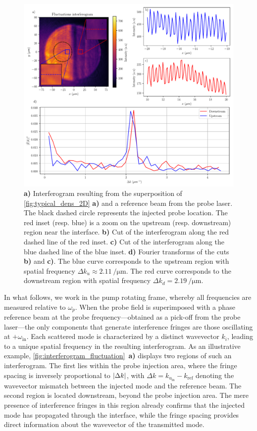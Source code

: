 \begin{figure}
    \centering
    \includegraphics[width=1\textwidth]{chap_stimulated_hawking/fig/interferogram_fluctuations.pdf}
    \caption{\textbf{a)} Interferogram resulting from the superposition of \autoref{fig:typical_dens_2D} \textbf{a)} and a reference beam from the probe laser. The black dashed circle
    represents the injected probe location. The red inset (resp. blue) is a zoom on the upstream (resp. downstream) region near the interface. 
    \textbf{b)} Cut of the interferogram along the red dashed line of the red inset. 
    \textbf{c)} Cut of the interferogram along the blue dashed line of the blue inset. 
    \textbf{d)} Fourier transforms of the cuts \textbf{b)} and \textbf{c)}. The blue curve corresponds to the upstream region with spatial frequency $\Delta k_u\approx\SI{2.11}{\per \micro \meter}$. The red curve corresponds to the downstream region with spatial frequency $\Delta k_d= \SI{2.19}{\per \micro \meter}$. 
     }
    \label{fig:interferogram_fluctuation}
\end{figure}
In what follows, we work in the pump rotating frame, whereby all frequencies are measured relative to $\omega_p$.
When the probe field is superimposed with a phase reference beam at the probe frequency—obtained as a pick-off from the probe laser—the only components that generate interference fringes are those oscillating at \(+\omega_{\text{in}}\). 
Each scattered mode is characterized by a distinct wavevector \(k_i\), leading to a unique spatial frequency in the resulting interferogram.
As an illustrative example, \autoref{fig:interferogram_fluctuation}~\textbf{a)} displays two regions of such an interferogram.
 The first lies within the probe injection area, where the fringe spacing is inversely proportional to \(\abs{\Delta k}\), with \(\Delta k = k_{u_{\text{in}}} - k_{\text{ref}}\) denoting the wavevector mismatch between the injected mode and the reference beam. 
 The second region is located downstream, beyond the probe injection area. The mere presence of interference fringes in this region already confirms that the injected mode has propagated through the interface, while the fringe spacing provides direct information about the wavevector of the transmitted mode.

